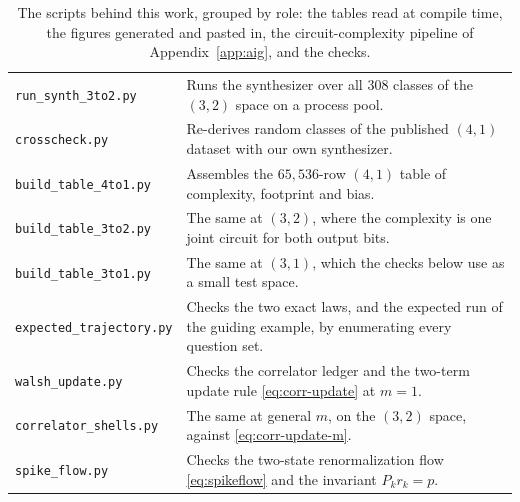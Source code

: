 \documentclass[11pt]{article}
\begin{document}
\begin{table}[H]
\begin{center}
\begin{tabular}{@{}l p{10.3cm}@{}}
\texttt{run\_synth\_3to2.py} & Runs the synthesizer over all $308$ classes
  of the $(3,2)$ space on a process pool. \\
\texttt{crosscheck.py} & Re-derives random classes of the published $(4,1)$
  dataset with our own synthesizer. \\
\texttt{build\_table\_4to1.py} & Assembles the $65{,}536$-row $(4,1)$ table
  of complexity, footprint and bias. \\
\texttt{build\_table\_3to2.py} & The same at $(3,2)$, where the complexity
  is one joint circuit for both output bits. \\
\texttt{build\_table\_3to1.py} & The same at $(3,1)$, which the checks below
  use as a small test space. \\
\addlinespace[5pt]
\texttt{expected\_trajectory.py} & Checks the two exact laws, and the
  expected run of the guiding example, by enumerating every question set. \\
\texttt{walsh\_update.py} & Checks the correlator ledger and the two-term
  update rule \eqref{eq:corr-update} at $m = 1$. \\
\texttt{correlator\_shells.py} & The same at general $m$, on the $(3,2)$
  space, against \eqref{eq:corr-update-m}. \\
\texttt{spike\_flow.py} & Checks the two-state renormalization flow
  \eqref{eq:spikeflow} and the invariant $P_k r_k = p$. \\
\bottomrule
\end{tabular}
\end{center}
\caption{The scripts behind this work, grouped by role: the tables read at
compile time, the figures generated and pasted in, the circuit-complexity
pipeline of Appendix~\ref{app:aig}, and the checks.}
\label{tab:scripts}
\end{table}
\end{document}
